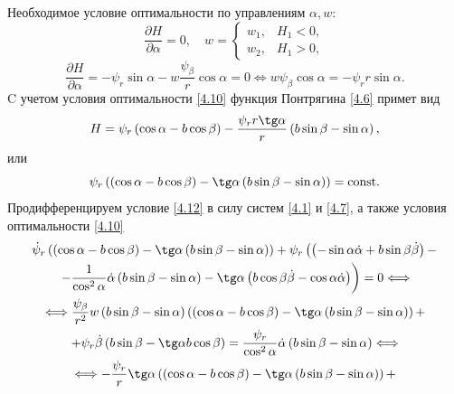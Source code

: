 \documentclass[a4paper,12pt, openany]{book}
\theoremstyle{plain} %
\theoremstyle{definition} %
\theoremstyle{remark} %
\numberwithin{equation}{chapter}
\begin{document}
{Необходимое условие оптимальности по управлениям $\alpha,w$:
\begin{equation}\label{4.9}
\frac{{\partial H}}{{\partial \alpha }} = 0,\quad w = 
\begin{cases}
w_1, & H_1 < 0, \\
w_2, & H_1 > 0, 
\end{cases}
\end{equation}
\begin{equation}\label{4.10}
\frac{{\partial H}}{{\partial \alpha }} =  - \psi _r \sin \alpha  - w\frac{{\psi _\beta  }}{r}\cos \alpha  = 0 \Longleftrightarrow w\psi _\beta  \cos \alpha  =  - \psi _r r\sin \alpha .
\end{equation}
C учетом условия оптимальности \eqref{4.10} функция Понтрягина \eqref{4.6} примет вид
\begin{equation}\label{4.11}
H = \psi _r \left( {\cos \alpha  - b\cos \beta } \right) - \frac{{\psi _r r\tg\alpha }}{r}\left( {b\sin \beta  - \sin \alpha } \right),
\end{equation}
или
\begin{equation}\label{4.12}
\psi _r \left( {\left( {\cos \alpha  - b\cos \beta } \right) - \tg\alpha \left( {b\sin \beta  - \sin \alpha } \right)} \right) = \mathrm{const}.
\end{equation}
Продифференцируем условие \eqref{4.12} в силу систем \eqref{4.1} и \eqref{4.7}, а также условия оптимальности \eqref{4.10}
\begin{multline*}
\dot \psi _r \left( {\left( {\cos \alpha  - b\cos \beta } \right) - \tg\alpha \left( {b\sin \beta  - \sin \alpha } \right)} \right) + \psi _r \left( {\left( { - \sin \alpha \dot \alpha  + b\sin \beta \dot \beta } \right) - } \right. \\
\left. { - \frac{1}{{\cos ^2 \alpha }}\dot \alpha \left( {b\sin \beta  - \sin \alpha } \right) - \tg\alpha \left( {b\cos \beta \dot \beta  - \cos \alpha \dot \alpha } \right)} \right) = 0 \Longleftrightarrow \\
\Longleftrightarrow
\frac{{\psi _\beta  }}{{r^2 }}w\left( {b\sin \beta  - \sin \alpha } \right)\left( {\left( {\cos \alpha  - b\cos \beta } \right) - \tg\alpha \left( {b\sin \beta  - \sin \alpha } \right)} \right) + \\
 + \psi _r \dot \beta \left( {b\sin \beta  - \tg\alpha b\cos \beta } \right) = \frac{{\psi _r }}{{\cos ^2 \alpha }}\dot \alpha \left( {b\sin \beta  - \sin \alpha } \right) \Longleftrightarrow \\
 \Longleftrightarrow  - \frac{{\psi _r }}{r}\tg\alpha \left( {\left( {\cos \alpha  - b\cos \beta } \right) - \tg\alpha \left( {b\sin \beta  - \sin \alpha } \right)} \right) + \\

\end{multline*}}
\end{document}
